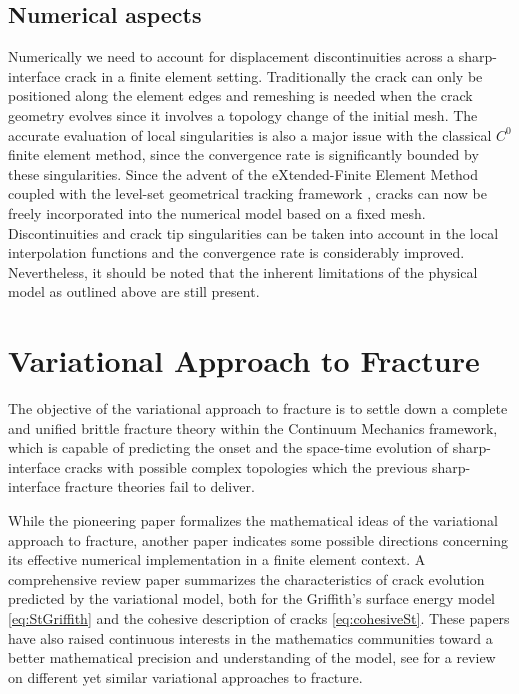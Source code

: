 \subsection{Numerical aspects}
Numerically we need to account for displacement discontinuities across a sharp-interface crack in a finite element setting. Traditionally the crack can only be positioned along the element edges and remeshing is needed when the crack geometry evolves since it involves a topology change of the initial mesh. The accurate evaluation of local singularities is also a major issue with the classical $C^0$ finite element method, since the convergence rate is significantly bounded by these singularities. Since the advent of the eXtended-Finite Element Method \cite{Moes:1999aa} coupled with the level-set geometrical tracking framework \cite{Stolarska:2001aa}, cracks can now be freely incorporated into the numerical model based on a fixed mesh. Discontinuities and crack tip singularities can be taken into account in the local interpolation functions and the convergence rate is considerably improved. Nevertheless, it should be noted that the inherent limitations of the physical model as outlined above are still present.

\section{Variational Approach to Fracture} \label{sec:fm98}
The objective of the variational approach to fracture is to settle down a complete and unified brittle fracture theory within the Continuum Mechanics framework, which is capable of predicting the onset and the space-time evolution of sharp-interface cracks with possible complex topologies which the previous sharp-interface fracture theories fail to deliver.

While the pioneering paper \cite{FrancfortMarigo:1998} formalizes the mathematical ideas of the variational approach to fracture, another paper \cite{BourdinFrancfortMarigo:2000} indicates some possible directions concerning its effective numerical implementation in a finite element context. A comprehensive review paper \cite{BourdinFrancfortMarigo:2008} summarizes the characteristics of crack evolution predicted by the variational model, both for the Griffith's surface energy model \eqref{eq:StGriffith} and the cohesive description of cracks \eqref{eq:cohesiveSt}. These papers have also raised continuous interests in the mathematics communities toward a better mathematical precision and understanding of the model, see \cite{Negri:2010aa} for a review on different yet similar variational approaches to fracture.

